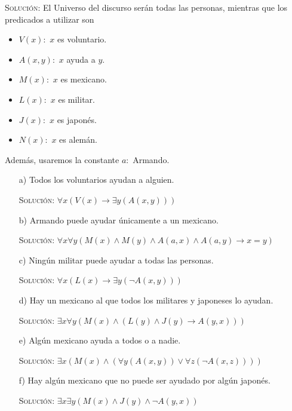 \documentclass[letterpaper,11pt]{article}
\begin{document}
\begin{enumerate}
    \textsc{Solución:} El Universo del discurso serán todas las personas,
    mientras que los predicados a utilizar son 

    \begin{itemize}
        \item $V(x):$ $x$ es voluntario.
        \item $A(x, y):$ $x$ ayuda a $y$.
        \item $M(x):$ $x$ es mexicano.
        \item $L(x):$ $x$ es militar.
        \item $J(x):$ $x$ es japonés.
        \item $N(x):$ $x$ es alemán.
    \end{itemize}

    Además, usaremos la constante $a:$ Armando.

    \begin{itemize}
        \item[a)] Todos los voluntarios ayudan a alguien.

        \textsc{Solución:} $∀x (V(x) → ∃y (A(x, y)))$

        \item[b)] Armando puede ayudar únicamente a un mexicano.

        \textsc{Solución:} $∀x ∀y (M(x) \land M(y) \land A(a, x) \land A(a, y) → x = y)$

        \item[c)] Ningún militar puede ayudar a todas las personas.

        \textsc{Solución:} $∀x (L(x) → ∃y (\neg A(x, y)))$

        \item[d)] Hay un mexicano al que todos los militares y japoneses lo 
        ayudan.

        \textsc{Solución:} $∃x ∀y (M(x) \land (L(y) \land J(y) → A(y, x)))$
        
        \item[e)] Algún mexicano ayuda a todos o a nadie.

        \textsc{Solución:} $∃x (M(x) \land (∀y (A(x, y)) \lor ∀z (\neg A(x, z))))$

        \item[f)] Hay algún mexicano que no puede ser ayudado por algún 
        japonés. 

        \textsc{Solución:} $∃x ∃y (M(x) \land J(y) \land \neg A(y, x))$
        

\end{itemize}
\end{enumerate}
\end{document}
